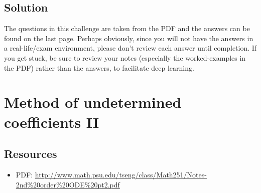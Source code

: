 %

\subsection*{Solution}
The questions in this challenge are taken from the PDF and the answers can be found on the last page. Perhaps obviously, since you will not have the answers in a real-life/exam environment, please don't review each answer until completion. If you get stuck, be sure to review your notes (especially the worked-examples in the PDF) rather than the answers, to facilitate deep learning. 

\timebox




\newpage
\section{Method of undetermined coefficients II}

\subsection*{Resources}
\begin{itemize}
    \item PDF: \url{http://www.math.psu.edu/tseng/class/Math251/Notes-2nd\%20order\%20ODE\%20pt2.pdf}
\end{itemize}

